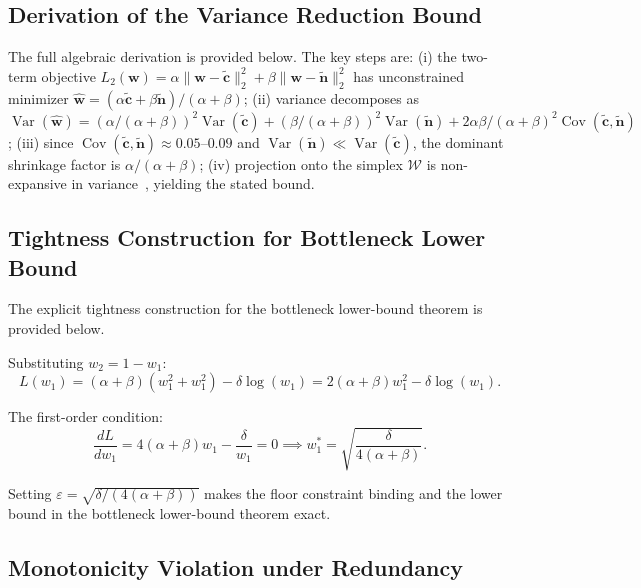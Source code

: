 \documentclass[a4paper,fleqn]{cas-sc}
\begin{document}
\subsection{Derivation of the Variance Reduction Bound}
\label{app:variance-derivation}

The full algebraic derivation is provided below. The key steps are: (i) the two-term objective $L_2(\mathbf{w}) = \alpha\|\mathbf{w} - \tilde{\mathbf{c}}\|_2^2 + \beta\|\mathbf{w} - \tilde{\mathbf{n}}\|_2^2$ has unconstrained minimizer $\hat{\mathbf{w}} = (\alpha\tilde{\mathbf{c}} + \beta\tilde{\mathbf{n}})/(\alpha+\beta)$; (ii) variance decomposes as $\operatorname{Var}(\hat{\mathbf{w}}) = (\alpha/(\alpha+\beta))^2\operatorname{Var}(\tilde{\mathbf{c}}) + (\beta/(\alpha+\beta))^2\operatorname{Var}(\tilde{\mathbf{n}}) + 2\alpha\beta/(\alpha+\beta)^2\operatorname{Cov}(\tilde{\mathbf{c}}, \tilde{\mathbf{n}})$; (iii) since $\operatorname{Cov}(\tilde{\mathbf{c}}, \tilde{\mathbf{n}}) \approx 0.05$--$0.09$ and $\operatorname{Var}(\tilde{\mathbf{n}}) \ll \operatorname{Var}(\tilde{\mathbf{c}})$, the dominant shrinkage factor is $\alpha/(\alpha+\beta)$; (iv) projection onto the simplex $\mathcal{W}$ is non-expansive in variance~\cite{wang2013projection}, yielding the stated bound.

\subsection{Tightness Construction for Bottleneck Lower Bound}
\label{app:bottleneck-tightness}

The explicit tightness construction for the bottleneck lower-bound theorem is provided below.

Substituting $w_2 = 1 - w_1$:
\begin{equation}
L(w_1) = (\alpha+\beta)(w_1^2 + w_1^2) - \delta\log(w_1) = 2(\alpha+\beta)w_1^2 - \delta\log(w_1).
\end{equation}

The first-order condition:
\begin{equation}
\frac{dL}{dw_1} = 4(\alpha+\beta)w_1 - \frac{\delta}{w_1} = 0 \implies w_1^* = \sqrt{\frac{\delta}{4(\alpha+\beta)}}.
\end{equation}

Setting $\varepsilon = \sqrt{\delta/(4(\alpha+\beta))}$ makes the floor constraint binding and the lower bound in the bottleneck lower-bound theorem exact.

\subsection{Monotonicity Violation under Redundancy}
\label{app:monotonicity-redundancy}
\end{document}
